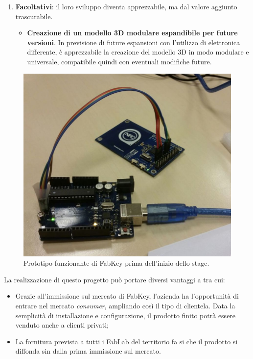 \begin{enumerate}
\medskip

\item \textbf{Facoltativi}: il loro sviluppo diventa apprezzabile, ma dal valore aggiunto trascurabile.
\begin{itemize}
\item \textbf{Creazione di un modello 3D modulare espandibile per future versioni}. In previsione di future espansioni con l'utilizzo di elettronica differente, è apprezzabile la creazione del modello 3D in modo modulare e universale, compatibile quindi con eventuali modifiche future. 
\end{itemize}
\end{enumerate}

\begin{figure}[H]
	\begin{center}
	\includegraphics[scale=0.25]{immagini/fabkey_prima.jpg}
	\caption{Prototipo funzionante di FabKey prima dell'inizio dello stage.}
	\end{center}
\end{figure}

La realizzazione di questo progetto può portare diversi vantaggi a \lab{} tra cui:

\begin{itemize}
\item Grazie all'immissione sul mercato di FabKey, l'azienda ha l'opportunità di entrare nel mercato \textit{consumer}, ampliando così il tipo di clientela. Data la semplicità di installazione e configurazione, il prodotto finito potrà essere venduto anche a clienti privati;

\item La fornitura prevista a tutti i FabLab del territorio fa si che il prodotto si diffonda sin dalla prima immissione sul mercato.
\end{itemize}

